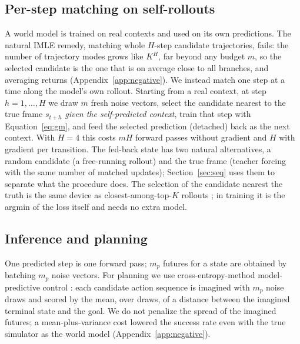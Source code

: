 \subsection{Per-step matching on self-rollouts}
\label{sec:seqmatch}
A world model is trained on real contexts and used on its own predictions. The natural IMLE remedy, matching whole $H$-step candidate trajectories, fails: the number of trajectory modes grows like $K^H$, far beyond any budget $m$, so the selected candidate is the one that is on average close to all branches, and averaging returns (Appendix~\ref{app:negative}). We instead match one step at a time along the model's own rollout. Starting from a real context, at step $h = 1,\dots,H$ we draw $m$ fresh noise vectors, select the candidate nearest to the true frame $s_{t+h}$ \emph{given the self-predicted context}, train that step with Equation~\ref{eq:gm}, and feed the selected prediction (detached) back as the next context. With $H = 4$ this costs $mH$ forward passes without gradient and $H$ with gradient per transition. The fed-back state has two natural alternatives, a random candidate (a free-running rollout) and the true frame (teacher forcing with the same number of matched updates); Section~\ref{sec:seq} uses them to separate what the procedure does. The selection of the candidate nearest the truth is the same device as closest-among-top-$K$ rollouts \citep{zhang2025catk}; in \nom{} training it is the argmin of the loss itself and needs no extra model.

\subsection{Inference and planning}
One predicted step is one forward pass; $m_p$ futures for a state are obtained by batching $m_p$ noise vectors. For planning we use cross-entropy-method model-predictive control \citep[CEM-MPC;][]{rubinstein1999cem,zhou2025dinowm}: each candidate action sequence is imagined with $m_p$ noise draws and scored by the mean, over draws, of a distance between the imagined terminal state and the goal. We do not penalize the spread of the imagined futures; a mean-plus-variance cost lowered the success rate even with the true simulator as the world model (Appendix~\ref{app:negative}).

